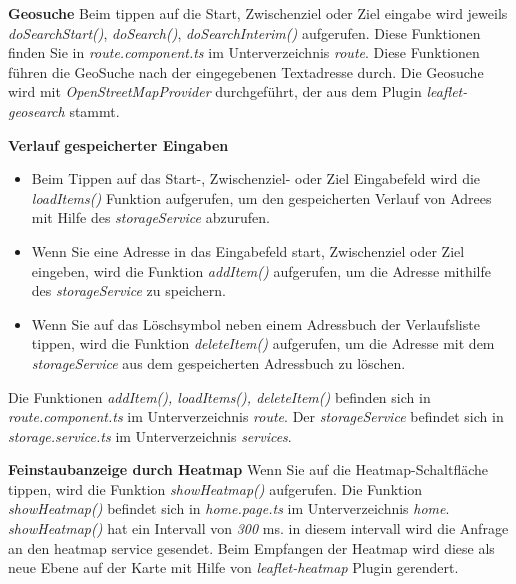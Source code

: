 \textbf{Geosuche} \newline
Beim tippen auf die Start, Zwischenziel oder Ziel eingabe wird jeweils \textit{doSearchStart()}, \textit{doSearch()}, \textit{doSearchInterim()} aufgerufen. 
Diese Funktionen finden Sie in \textit{route.component.ts} im Unterverzeichnis \textit{route}. 
Diese Funktionen führen die GeoSuche nach der eingegebenen Textadresse durch. 
Die Geosuche wird mit \textit{OpenStreetMapProvider} durchgeführt, der aus dem Plugin \textit{leaflet-geosearch} stammt.

\textbf{Verlauf gespeicherter Eingaben}\newline 
\begin{itemize}
	\item Beim Tippen auf das Start-, Zwischenziel- oder Ziel Eingabefeld wird die \textit{loadItems()} Funktion aufgerufen, um den gespeicherten Verlauf von Adrees mit Hilfe des \textit{storageService} abzurufen.
	
	\item Wenn Sie eine Adresse in das Eingabefeld start, Zwischenziel oder Ziel eingeben, wird die Funktion \textit{addItem()} aufgerufen, um die Adresse mithilfe des \textit{storageService} zu speichern.
	
	\item Wenn Sie auf das Löschsymbol neben einem Adressbuch der Verlaufsliste tippen, wird die Funktion \textit{deleteItem()} aufgerufen, um die Adresse mit dem \textit{storageService} aus dem gespeicherten Adressbuch zu löschen.
	
\end{itemize}
Die Funktionen \textit{addItem(), loadItems(), deleteItem()} befinden sich in \textit{route.component.ts} im Unterverzeichnis \textit{route}. 
Der \textit{storageService} befindet sich in \textit{storage.service.ts} im Unterverzeichnis \textit{services}.

\textbf{Feinstaubanzeige durch Heatmap}\newline
Wenn Sie auf die Heatmap-Schaltfläche tippen, wird die Funktion \textit{showHeatmap()} aufgerufen. 
Die Funktion \textit{showHeatmap()} befindet sich in \textit{home.page.ts} im Unterverzeichnis \textit{home}. 
\textit{showHeatmap()} hat ein Intervall von \textit{300} ms. in diesem intervall wird die Anfrage an den heatmap service gesendet. 
Beim Empfangen der Heatmap wird diese als neue Ebene auf der Karte mit Hilfe von \textit{leaflet-heatmap} Plugin gerendert.

